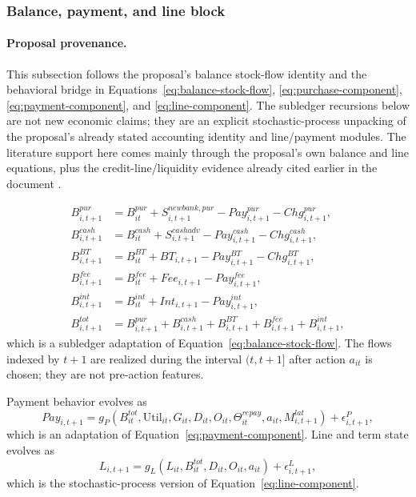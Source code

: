 \documentclass[11pt]{article}
\newcommand{\1}{\mathbf{1}}
\begin{document}
\subsubsection{Balance, payment, and line block}
\label{subsec:state-space-balance-block}

\paragraph{Proposal provenance.}
This subsection follows the proposal's balance stock-flow identity and the
behavioral bridge in Equations~\eqref{eq:balance-stock-flow},
\eqref{eq:purchase-component}, \eqref{eq:payment-component}, and
\eqref{eq:line-component}. The subledger recursions below are not new economic
claims; they are an explicit stochastic-process unpacking of the proposal's
already stated accounting identity and line/payment modules. The literature
support here comes mainly through the proposal's own balance and line equations,
plus the credit-line/liquidity evidence already cited earlier in the document
\citep{gross2001liquidity}.

\begin{align}
  B^{pur}_{i,t+1}
    &= B^{pur}_{it} + S^{newbank,pur}_{i,t+1} - Pay^{pur}_{i,t+1}
       - Chg^{pur}_{i,t+1},
       \label{eq:ss-balance-pur}\\
  B^{cash}_{i,t+1}
    &= B^{cash}_{it} + S^{cashadv}_{i,t+1} - Pay^{cash}_{i,t+1}
       - Chg^{cash}_{i,t+1},
       \label{eq:ss-balance-cash}\\
  B^{BT}_{i,t+1}
    &= B^{BT}_{it} + BT_{i,t+1} - Pay^{BT}_{i,t+1}
       - Chg^{BT}_{i,t+1},
       \label{eq:ss-balance-bt}\\
  B^{fee}_{i,t+1}
    &= B^{fee}_{it} + Fee_{i,t+1} - Pay^{fee}_{i,t+1},
       \label{eq:ss-balance-fee}\\
  B^{int}_{i,t+1}
    &= B^{int}_{it} + Int_{i,t+1} - Pay^{int}_{i,t+1},
       \label{eq:ss-balance-int}\\
  B^{tot}_{i,t+1}
    &= B^{pur}_{i,t+1}+B^{cash}_{i,t+1}+B^{BT}_{i,t+1}
       +B^{fee}_{i,t+1}+B^{int}_{i,t+1},
       \label{eq:ss-balance-total}
\end{align}
which is a subledger adaptation of Equation~\eqref{eq:balance-stock-flow}. The
flows indexed by $t+1$ are realized during the interval $(t,t+1]$ after action
$a_{it}$ is chosen; they are not pre-action features.

Payment behavior evolves as
\begin{equation}
  Pay_{i,t+1}
  =
  g_P(B^{tot}_{it},\mathrm{Util}_{it},G_{it},D_{it},O_{it},\Theta^{repay}_{it},a_{it},M^{lat}_{i,t+1})
  + \epsilon^P_{i,t+1},
  \label{eq:ss-payment-transition}
\end{equation}
which is an adaptation of Equation~\eqref{eq:payment-component}. Line and term
state evolves as
\begin{equation}
  L_{i,t+1}
  =
  g_L(L_{it},B^{tot}_{it},D_{it},O_{it},a_{it}) + \epsilon^L_{i,t+1},
  \label{eq:ss-line-transition}
\end{equation}
which is the stochastic-process version of Equation~\eqref{eq:line-component}.
\end{document}
